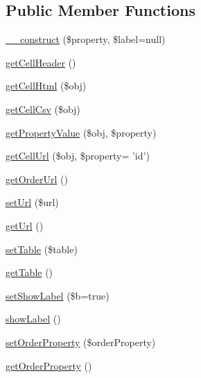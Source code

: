\subsection*{Public Member Functions}
\begin{DoxyCompactItemize}
\item 
\hyperlink{classTk_1_1Table_1_1Cell_1_1Iface_a22adb90cf3dbaaf9b57ff81b30d1c5f0}{\+\_\+\+\_\+construct} (\$property, \$label=null)
\item 
\hyperlink{classTk_1_1Table_1_1Cell_1_1Iface_afa44ea3a1a9d0fc44afdc7f08c2a729c}{get\+Cell\+Header} ()
\item 
\hyperlink{classTk_1_1Table_1_1Cell_1_1Iface_ac0eb96286c58f6124f2545ffd23670cf}{get\+Cell\+Html} (\$obj)
\item 
\hyperlink{classTk_1_1Table_1_1Cell_1_1Iface_a17f7cbaa99c95143f835215ef2680967}{get\+Cell\+Csv} (\$obj)
\item 
\hyperlink{classTk_1_1Table_1_1Cell_1_1Iface_a3d600ecdfc436d64f3f924d900c56a55}{get\+Property\+Value} (\$obj, \$property)
\item 
\hyperlink{classTk_1_1Table_1_1Cell_1_1Iface_a9c86a458c2008ca369f1194ed1975e84}{get\+Cell\+Url} (\$obj, \$property= 'id')
\item 
\hyperlink{classTk_1_1Table_1_1Cell_1_1Iface_aad435a709e8b3eab04927afb090cb038}{get\+Order\+Url} ()
\item 
\hyperlink{classTk_1_1Table_1_1Cell_1_1Iface_a651f5d1cbcd908a8ceae0974624eb3e2}{set\+Url} (\$url)
\item 
\hyperlink{classTk_1_1Table_1_1Cell_1_1Iface_a0e0712e54e4d6981c6c38cdd9c19939b}{get\+Url} ()
\item 
\hyperlink{classTk_1_1Table_1_1Cell_1_1Iface_a0aa6b1b55a62947b2e50da5fc40cf459}{set\+Table} (\$table)
\item 
\hyperlink{classTk_1_1Table_1_1Cell_1_1Iface_a0c727f990ef9aeb669d90251c9943cb2}{get\+Table} ()
\item 
\hyperlink{classTk_1_1Table_1_1Cell_1_1Iface_a47be86ee76decc0a80c5dad80decad27}{set\+Show\+Label} (\$b=true)
\item 
\hyperlink{classTk_1_1Table_1_1Cell_1_1Iface_a5210d93e0d33f3faba358edf5be0d1b1}{show\+Label} ()
\item 
\hyperlink{classTk_1_1Table_1_1Cell_1_1Iface_a1447afd0a2d37db622fb3b908012a0a0}{set\+Order\+Property} (\$order\+Property)
\item 
\hyperlink{classTk_1_1Table_1_1Cell_1_1Iface_a868fa3a5f11cb00e5ae8b35bc4c0a51a}{get\+Order\+Property} ()
\item 

\end{DoxyCompactItemize}
